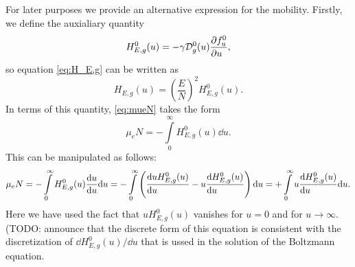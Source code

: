 \documentclass{book}
\begin{document}
For later purposes we provide an alternative expression for the mobility. Firstly,
we define the auxialiary quantity
\begin{equation}
	H_{E,g}^0(u) = - \gamma{\cal D}_{g}^0(u)\PDEV{f^0_u}{u},
	\label{eq:H_E,g^0}
\end{equation}
so equation \eqref{eq:H_E,g} can be written as
\begin{equation}
	H_{E,g}(u) = \left(\frac{E}{N}\right)^2H_{E,g}^0(u).
\end{equation}
In terms of this quantity, \eqref{eq:mueN} takes the form
\begin{equation}
	\mu_eN = -\int\limits_0^\infty H_{E,g}^0(u) \dd{u}.
\end{equation}
This can be manipulated as follows:
\begin{equation}
	\mu_eN
	= -\int\limits_0^\infty H_{E,g}^0(u) \DERIV{u}{u} \dd{u}
	= -\int\limits_0^\infty \left(\DERIV{uH_{E,g}^0(u)}{u} - u\DERIV{H_{E,g}^0(u)}{u}\right)\dd{u}
	= +\int\limits_0^\infty u\DERIV{H_{E,g}^0(u)}{u}\dd{u}.
	\label{eq:mueN-alt}
\end{equation}
Here we have used the fact that $uH_{E,g}^0(u)$ vanishes for $u=0$ and for
$u\rightarrow\infty$. (TODO: announce that the discrete form of this equation
is consistent with the discretization of $\dd{H_{E,g}^0(u)}/\dd{u}$ that is
ussed in the solution of the Boltzmann equation.
\end{document}
